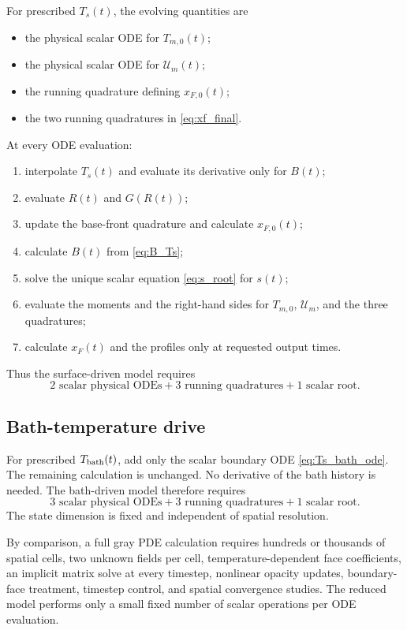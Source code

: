 \documentclass[11pt]{article}
\numberwithin{equation}{section}
\newcommand{\Ts}{T_s}
\newcommand{\Tb}{T_{\rm bath}}
\newcommand{\Tm}{T_{m,0}}
\newcommand{\xf}{x_F}
\newcommand{\xfzero}{x_{F,0}}
\newcommand{\calU}{\mathcal{U}}
\begin{document}
For prescribed $\Ts(t)$, the evolving quantities are
\begin{itemize}
 \item the physical scalar ODE for $\Tm(t)$;
 \item the physical scalar ODE for $\calU_m(t)$;
 \item the running quadrature defining $\xfzero(t)$;
 \item the two running quadratures in \eqref{eq:xf_final}.
\end{itemize}
At every ODE evaluation:
\begin{enumerate}
 \item interpolate $\Ts(t)$ and evaluate its derivative only for $B(t)$;
 \item evaluate $R(t)$ and $G(R(t))$;
 \item update the base-front quadrature and calculate $\xfzero(t)$;
 \item calculate $B(t)$ from \eqref{eq:B_Ts};
 \item solve the unique scalar equation \eqref{eq:s_root} for $s(t)$;
 \item evaluate the moments and the right-hand sides for $\Tm$, $\calU_m$,
       and the three quadratures;
 \item calculate $\xf(t)$ and the profiles only at requested output times.
\end{enumerate}
Thus the surface-driven model requires
\begin{equation}
 \boxed{
 2\text{ scalar physical ODEs}
 +3\text{ running quadratures}
 +1\text{ scalar root}.}
 \label{eq:complexity_Ts}
\end{equation}

\subsection{Bath-temperature drive}

For prescribed $\Tb(t)$, add only the scalar boundary ODE
\eqref{eq:Ts_bath_ode}.  The remaining calculation is unchanged.  No
derivative of the bath history is needed.  The bath-driven model therefore
requires
\begin{equation}
 \boxed{
 3\text{ scalar physical ODEs}
 +3\text{ running quadratures}
 +1\text{ scalar root}.}
 \label{eq:complexity_Tbath}
\end{equation}
The state dimension is fixed and independent of spatial resolution.

By comparison, a full gray PDE calculation requires hundreds or thousands of
spatial cells, two unknown fields per cell, temperature-dependent face
coefficients, an implicit matrix solve at every timestep, nonlinear opacity
updates, boundary-face treatment, timestep control, and spatial convergence
studies.  The reduced model performs only a small fixed number of scalar
operations per ODE evaluation.
\end{document}
